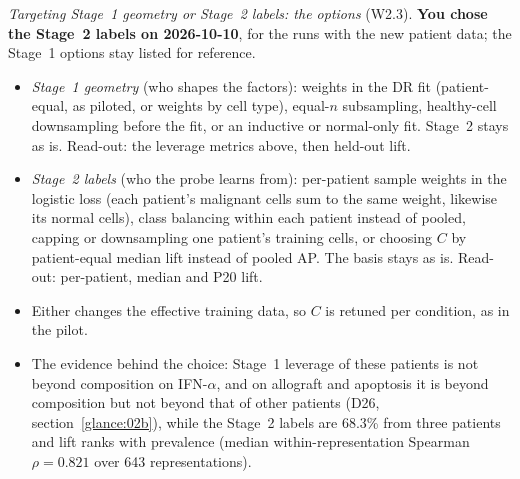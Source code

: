 \emph{Targeting Stage~1 geometry or Stage~2 labels: the options} (W2.3). \textbf{You chose the Stage~2 labels on 2026-10-10}, for the runs with the new patient data; the Stage~1 options stay listed for reference.
\begin{itemize}
\item \emph{Stage~1 geometry} (who shapes the factors): weights in the DR fit (patient-equal, as piloted, or weights by cell type), equal-$n$ subsampling, healthy-cell downsampling before the fit, or an inductive or normal-only fit. Stage~2 stays as is. Read-out: the leverage metrics above, then held-out lift.
\item \emph{Stage~2 labels} (who the probe learns from): per-patient sample weights in the logistic loss (each patient's malignant cells sum to the same weight, likewise its normal cells), class balancing within each patient instead of pooled, capping or downsampling one patient's training cells, or choosing $C$ by patient-equal median lift instead of pooled AP. The basis stays as is. Read-out: per-patient, median and P20 lift.
\item Either changes the effective training data, so $C$ is retuned per condition, as in the pilot.
\item The evidence behind the choice: Stage~1 leverage of these patients is not beyond composition on IFN-$\alpha$, and on allograft and apoptosis it is beyond composition but not beyond that of other patients (D26, section~\ref{glance:02b}), while the Stage~2 labels are 68.3\% from three patients and lift ranks with prevalence (median within-representation Spearman $\rho = 0.821$ over 643 representations). 
\end{itemize}

